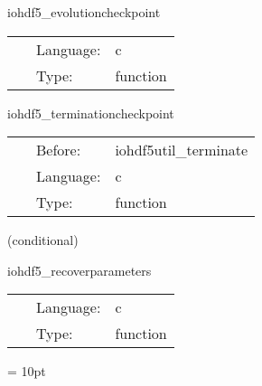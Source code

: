 \vspace{5mm}


\hspace{5mm} iohdf5\_evolutioncheckpoint 

\hspace{5mm}{\it evolution data checkpoint routine } 


\hspace{5mm}

 \begin{tabular*}{160mm}{cll} 
~ & Language:  & c \\ 
~ & Type:  & function \\ 
\end{tabular*} 


\vspace{5mm}


\hspace{5mm} iohdf5\_terminationcheckpoint 

\hspace{5mm}{\it termination checkpoint routine } 


\hspace{5mm}

 \begin{tabular*}{160mm}{cll} 
~ & Before:  & iohdf5util\_terminate \\ 
~ & Language:  & c \\ 
~ & Type:  & function \\ 
\end{tabular*} 


\vspace{5mm}

   (conditional) 

\hspace{5mm} iohdf5\_recoverparameters 

\hspace{5mm}{\it parameter recovery routine } 


\hspace{5mm}

 \begin{tabular*}{160mm}{cll} 
~ & Language:  & c \\ 
~ & Type:  & function \\ 
\end{tabular*} 



\vspace{5mm}\parskip = 10pt 
